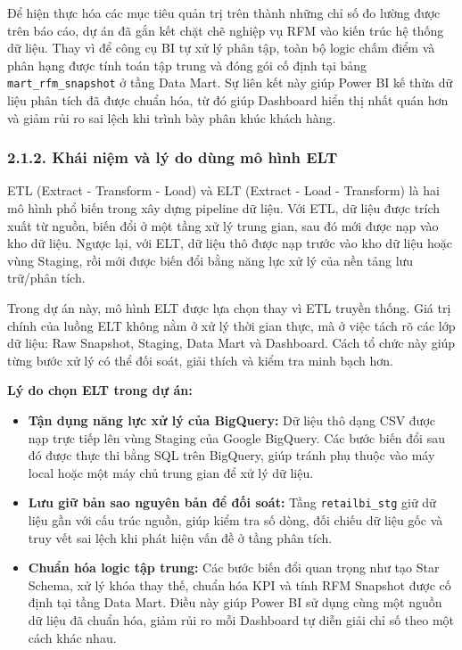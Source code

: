 \documentclass[12pt,a4paper]{article}
\newcommand{\code}[1]{\texttt{#1}}
\begin{document}
Để hiện thực hóa các mục tiêu quản trị trên thành những chỉ số đo lường được trên báo cáo, dự án đã gắn kết chặt chẽ nghiệp vụ RFM vào kiến trúc hệ thống dữ liệu. Thay vì để công cụ BI tự xử lý phân tập, toàn bộ logic chấm điểm và phân hạng được tính toán tập trung và đóng gói cố định tại bảng \code{mart\_rfm\_snapshot} ở tầng Data Mart. Sự liên kết này giúp Power BI kế thừa dữ liệu phân tích đã được chuẩn hóa, từ đó giúp Dashboard hiển thị nhất quán hơn và giảm rủi ro sai lệch khi trình bày phân khúc khách hàng.

\subsubsection{2.1.2. Khái niệm và lý do dùng mô hình ELT}

ETL (Extract - Transform - Load) và ELT (Extract - Load - Transform) là hai mô hình phổ biến trong xây dựng pipeline dữ liệu. Với ETL, dữ liệu được trích xuất từ nguồn, biến đổi ở một tầng xử lý trung gian, sau đó mới được nạp vào kho dữ liệu. Ngược lại, với ELT, dữ liệu thô được nạp trước vào kho dữ liệu hoặc vùng Staging, rồi mới được biến đổi bằng năng lực xử lý của nền tảng lưu trữ/phân tích.

Trong dự án này, mô hình ELT được lựa chọn thay vì ETL truyền thống. Giá trị chính của luồng ELT không nằm ở xử lý thời gian thực, mà ở việc tách rõ các lớp dữ liệu: Raw Snapshot, Staging, Data Mart và Dashboard. Cách tổ chức này giúp từng bước xử lý có thể đối soát, giải thích và kiểm tra minh bạch hơn.

\textbf{Lý do chọn ELT trong dự án:}

\begin{itemize}
    \item \textbf{Tận dụng năng lực xử lý của BigQuery:} Dữ liệu thô dạng CSV được nạp trực tiếp lên vùng Staging của Google BigQuery. Các bước biến đổi sau đó được thực thi bằng SQL trên BigQuery, giúp tránh phụ thuộc vào máy local hoặc một máy chủ trung gian để xử lý dữ liệu.
    \item \textbf{Lưu giữ bản sao nguyên bản để đối soát:} Tầng \code{retailbi\_stg} giữ dữ liệu gần với cấu trúc nguồn, giúp kiểm tra số dòng, đối chiếu dữ liệu gốc và truy vết sai lệch khi phát hiện vấn đề ở tầng phân tích.
    \item \textbf{Chuẩn hóa logic tập trung:} Các bước biến đổi quan trọng như tạo Star Schema, xử lý khóa thay thế, chuẩn hóa KPI và tính RFM Snapshot được cố định tại tầng Data Mart. Điều này giúp Power BI sử dụng cùng một nguồn dữ liệu đã chuẩn hóa, giảm rủi ro mỗi Dashboard tự diễn giải chỉ số theo một cách khác nhau.
\end{itemize}
\end{document}
